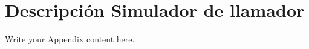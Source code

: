 
\chapter{Descripción Simulador de llamador} %

\label{AppendixA} %

Write your Appendix content here.
